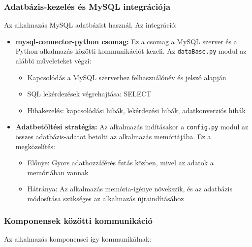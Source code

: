 \documentclass[]{thesis-ekf}
\begin{document}
	\subsubsection{Adatbázis-kezelés és MySQL integrációja}
	
	Az alkalmazás MySQL adatbázist használ. Az integráció:
	
	\begin{itemize}
		\item \textbf{mysql-connector-python csomag:} Ez a csomag a MySQL szerver és a Python alkalmazás közötti kommunikációt kezeli. Az \texttt{dataBase.py} modul az alábbi műveleteket végzi:
		\begin{itemize}
			\item Kapcsolódás a MySQL szerverhez felhasználónév és jelszó alapján
			\item SQL lekérdezések végrehajtása: SELECT
			\item Hibakezelés: kapcsolódási hibák, lekérdezési hibák, adatkonverziós hibák
		\end{itemize}
		
		
		\item \textbf{Adatbetöltési stratégia:} Az alkalmazás indításakor a \texttt{config.py} modul az összes adatbázis-adatot betölti az alkalmazás memóriájába. Ez a megközelítés:
		\begin{itemize}
			\item Előnye: Gyors adathozzáférés futás közben, mivel az adatok a memóriában vannak
			\item Hátránya: Az alkalmazás memória-igénye növekszik, és az adatbázis módosítása szükséges az alkalmazás újraindításához
		\end{itemize}
	\end{itemize}
	
	\subsubsection{Komponensek közötti kommunikáció}
	
	Az alkalmazás komponensei így kommunikálnak:
	
\end{document}
